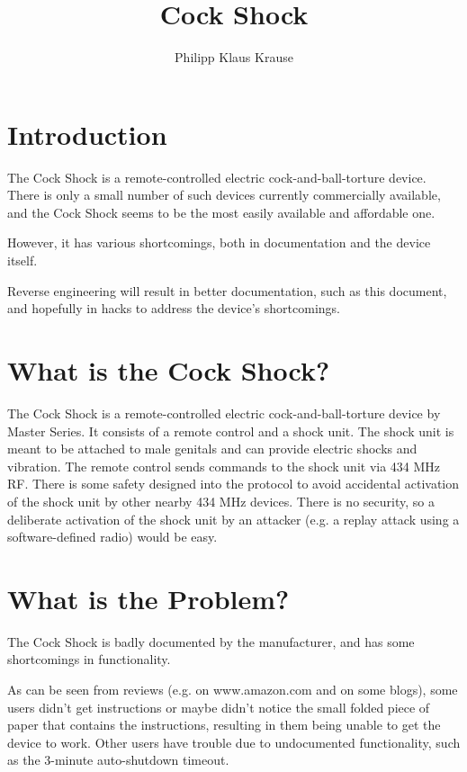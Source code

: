 \documentclass[a4paper]{article}
\begin{document}
\title{Cock Shock}
\author{Philipp Klaus Krause}

\maketitle

\section{Introduction}

The Cock Shock is a remote-controlled electric cock-and-ball-torture device. There is only a small number of such devices currently commercially available, and the Cock Shock seems to be the most easily available and affordable one.

However, it has various shortcomings, both in documentation and the device itself.

Reverse engineering will result in better documentation, such as this document, and hopefully in hacks to address the device's shortcomings.

\section{What is the Cock Shock?}

The Cock Shock is a remote-controlled electric cock-and-ball-torture device by Master Series. It consists of a remote control and a shock unit. The shock unit is meant to be attached to male genitals and can provide electric shocks and vibration. The remote control sends commands to the shock unit via 434 MHz RF. There is some safety designed into the protocol to avoid accidental activation of the shock unit by other nearby 434 MHz devices. There is no security, so a deliberate activation of the shock unit by an attacker (e.g. a replay attack using a software-defined radio) would be easy.

\section{What is the Problem?}

The Cock Shock is badly documented by the manufacturer, and has some shortcomings in functionality.

As can be seen from reviews (e.g. on www.amazon.com and on some blogs), some users didn't get instructions or maybe didn't notice the small folded piece of paper that contains the instructions, resulting in them being unable to get the device to work. Other users have trouble due to undocumented functionality, such as the 3-minute auto-shutdown timeout.
\end{document}
